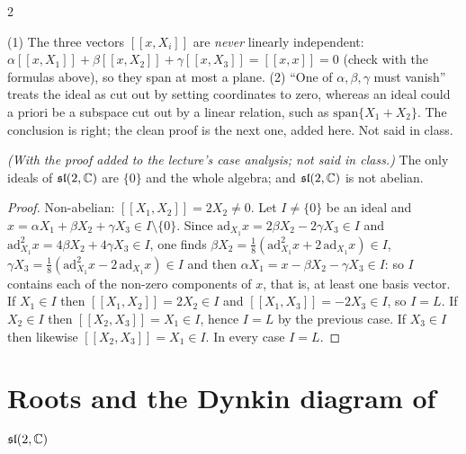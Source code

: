 \begin{paracol}{2}
\begin{coursenote}
(1) The three vectors $[\![x,X_i]\!]$ are \emph{never} linearly independent: $\alpha[\![x,X_1]\!]+\beta[\![x,X_2]\!]+\gamma[\![x,X_3]\!]=[\![x,x]\!]=0$ (check with the formulas above), so they span at most a plane. (2) ``One of $\alpha,\beta,\gamma$ must vanish'' treats the ideal as cut out by setting coordinates to zero, whereas an ideal could a priori be a subspace cut out by a linear relation, such as $\mathrm{span}\{X_1+X_2\}$. The conclusion is right; the clean proof is the next one, added here. Not said in class.  
\end{coursenote}
\begin{theorem}\label{thm:sa-simple}
\emph{(With the proof added to the lecture's case analysis; not said in class.)} The only ideals of $\mathfrak{sl}(2,\mathbb{C})$ are $\{0\}$ and the whole algebra; and $\mathfrak{sl}(2,\mathbb{C})$ is not abelian.
\end{theorem}
\begin{proof}
Non-abelian: $[\![X_1,X_2]\!]=2X_2\ne0$. Let $I\ne\{0\}$ be an ideal and $x=\alpha X_1+\beta X_2+\gamma X_3\in I\setminus\{0\}$. Since $\mathrm{ad}_{X_1}x=2\beta X_2-2\gamma X_3\in I$ and $\mathrm{ad}_{X_1}^2x=4\beta X_2+4\gamma X_3\in I$, one finds $\beta X_2=\frac18(\mathrm{ad}^2_{X_1}x+2\,\mathrm{ad}_{X_1}x)\in I$, $\gamma X_3=\frac18(\mathrm{ad}^2_{X_1}x-2\,\mathrm{ad}_{X_1}x)\in I$ and then $\alpha X_1=x-\beta X_2-\gamma X_3\in I$: so $I$ contains each of the non-zero components of $x$, that is, at least one basis vector. If $X_1\in I$ then $[\![X_1,X_2]\!]=2X_2\in I$ and $[\![X_1,X_3]\!]=-2X_3\in I$, so $I=L$. If $X_2\in I$ then $[\![X_2,X_3]\!]=X_1\in I$, hence $I=L$ by the previous case. If $X_3\in I$ then likewise $[\![X_2,X_3]\!]=X_1\in I$. In every case $I=L$.
\end{proof}

\section{Roots and the Dynkin diagram of $\mathfrak{sl}(2,\mathbb{C})$}\label{sec:sa-roots}


\end{paracol}
